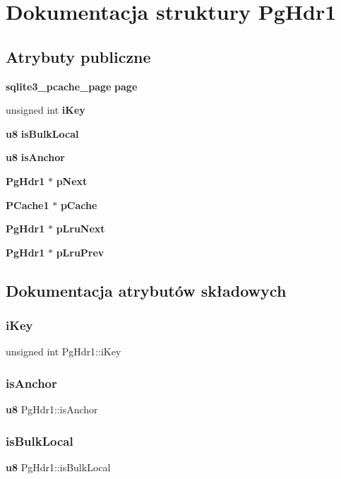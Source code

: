 \section{Dokumentacja struktury Pg\+Hdr1}
\label{struct_pg_hdr1}
\subsection*{Atrybuty publiczne}
\begin{DoxyCompactItemize}
\item 
\textbf{ sqlite3\+\_\+pcache\+\_\+page} \textbf{ page}
\item 
unsigned int \textbf{ i\+Key}
\item 
\textbf{ u8} \textbf{ is\+Bulk\+Local}
\item 
\textbf{ u8} \textbf{ is\+Anchor}
\item 
\textbf{ Pg\+Hdr1} $\ast$ \textbf{ p\+Next}
\item 
\textbf{ P\+Cache1} $\ast$ \textbf{ p\+Cache}
\item 
\textbf{ Pg\+Hdr1} $\ast$ \textbf{ p\+Lru\+Next}
\item 
\textbf{ Pg\+Hdr1} $\ast$ \textbf{ p\+Lru\+Prev}
\end{DoxyCompactItemize}


\subsection{Dokumentacja atrybutów składowych}
\mbox{\label{struct_pg_hdr1_ad122ef74f5f0137414882aabd111a01b}} 
\subsubsection{iKey}
{\footnotesize\ttfamily unsigned int Pg\+Hdr1\+::i\+Key}

\mbox{\label{struct_pg_hdr1_a232f677ac68bc8fbb7685e8a1955c810}} 
\subsubsection{isAnchor}
{\footnotesize\ttfamily \textbf{ u8} Pg\+Hdr1\+::is\+Anchor}

\mbox{\label{struct_pg_hdr1_a1c07bb6fab410b7c9f41b24c44a118de}} 
\subsubsection{isBulkLocal}
{\footnotesize\ttfamily \textbf{ u8} Pg\+Hdr1\+::is\+Bulk\+Local}

